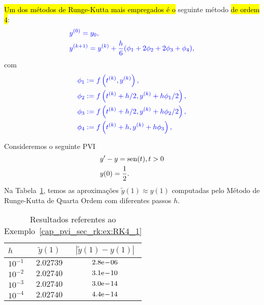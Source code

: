 \hl{Um dos métodos de Runge-Kutta mais empregados é o} seguinte método \hl{de ordem $4$}:
\begin{equation}\label{cap_pvi_sec_rk:eq:iter_rk4}\color{blue}\begin{aligned}
    &y^{(0)} = y_0,\\
    &y^{(k+1)} = y^{(k)} + \frac{h}{6}(\phi_1 + 2\phi_2 + 2\phi_3 + \phi_4),
  \end{aligned}
\end{equation}
com
\begin{subequations}\hleq
  \begin{align}
    \phi_1 &:= f\left(t^{(k)}, y^{(k)}\right),\\
    \phi_2 &:= f\left(t^{(k)}+h/2, y^{(k)}+h\phi_1/2\right),\\
    \phi_3 &:= f\left(t^{(k)}+h/2, y^{(k)}+h\phi_2/2\right),\\
    \phi_4 &:= f\left(t^{(k)}+h, y^{(k)}+h\phi_3\right),
  \end{align}
\end{subequations}

\begin{ex}\label{cap_pvi_sec_rk:ex:RK4_1}
  Consideremos o seguinte PVI
  \begin{subequations}
    \begin{align}
      &y' - y = \operatorname{sen}(t), t>0\\
      &y(0) = \frac{1}{2}.
    \end{align}
  \end{subequations}
  Na Tabela~\ref{cap_pvi_sec_rk:tab:ex_RK4_1}, temos as aproximações $\tilde{y}(1) \approx y(1)$ computadas pelo Método de Runge-Kutta de Quarta Ordem com diferentes passos $h$.
 
  \begin{table}[H]
    \centering
    \begin{tabular}{l|cc}
      $h$ & $\tilde{y}(1)$ & $|\tilde{y}(1)-y(1)|$\\\hline
      $10^{-1}$ & $2.02739$ & $2.8\mathrm{e}\!-\!06$ \\
      $10^{-2}$ & $2.02740$ & $3.1\mathrm{e}\!-\!10$ \\
      $10^{-3}$ & $2.02740$ & $3.0\mathrm{e}\!-\!14$ \\
      $10^{-4}$ & $2.02740$ & $4.4\mathrm{e}\!-\!14$ \\\hline
    \end{tabular}
    \caption{Resultados referentes ao Exemplo~\ref{cap_pvi_sec_rk:ex:RK4_1}}
    \label{cap_pvi_sec_rk:tab:ex_RK4_1}
  \end{table}
\end{ex}

